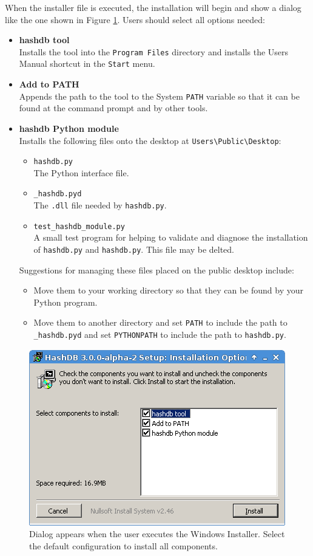 \documentclass[11pt,fleqn]{article} %
\begin{document}
When the installer file is executed, the installation will begin and show a dialog like the one shown in Figure \ref{fig:windowsInstaller}.  Users should select all options needed:
\begin{itemize}
\item \textbf{hashdb tool}\\
Installs the \hdb tool into the \verb+Program Files+ directory and installs the Users Manual shortcut in the \verb+Start+ menu.
\item \textbf{Add to PATH}\\
Appends the path to the \hdb tool to the System \verb+PATH+ variable so that it can be found at the command prompt and by other tools.
\item \textbf{hashdb Python module}\\
Installs the following files onto the desktop at \verb+Users\Public\Desktop+:
  \begin{itemize}
  \item \verb+hashdb.py+\\
  The \hdb Python interface file.
  \item \verb+_hashdb.pyd+\\
  The \verb+.dll+ file needed by \verb+hashdb.py+.
  \item \verb+test_hashdb_module.py+\\
  A small test program for helping to validate and diagnose the installation of \verb+hashdb.py+ and \verb+hashdb.py+. This file may be delted.
  \end{itemize}

Suggestions for managing these files placed on the public desktop include:
  \begin{itemize}
  \item Move them to your working directory so that they can be found by your Python program.
  \item Move them to another directory and set \verb+PATH+ to include the path to \verb+_hashdb.pyd+ and set \verb+PYTHONPATH+ to include the path to \verb+hashdb.py+.
  \end{itemize}
\end{itemize}

\begin{figure}
	\center
	\includegraphics[scale=.8]{WindowsInstaller.png}
	\caption{Dialog appears when the user executes the Windows Installer. Select the default configuration to install all components.}
	\label{fig:windowsInstaller}
\end{figure}
\end{document}
